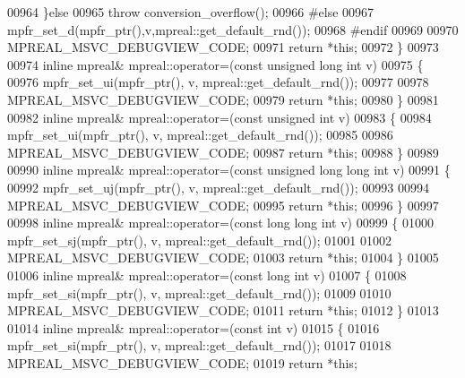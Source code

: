 \begin{DoxyCode}
00964   \}\textcolor{keywordflow}{else}
00965     \textcolor{keywordflow}{throw} conversion\_overflow();
00966 \textcolor{preprocessor}{#else}
00967   mpfr\_set\_d(mpfr\_ptr(),v,mpreal::get\_default\_rnd());
00968 \textcolor{preprocessor}{#endif}
00969 
00970   MPREAL\_MSVC\_DEBUGVIEW\_CODE;
00971     \textcolor{keywordflow}{return} *\textcolor{keyword}{this};
00972 \}
00973 
00974 \textcolor{keyword}{inline} mpreal& mpreal::operator=(\textcolor{keyword}{const} \textcolor{keywordtype}{unsigned} \textcolor{keywordtype}{long} \textcolor{keywordtype}{int} v)
00975 \{
00976     mpfr\_set\_ui(mpfr\_ptr(), v, mpreal::get\_default\_rnd());
00977 
00978     MPREAL\_MSVC\_DEBUGVIEW\_CODE;
00979     \textcolor{keywordflow}{return} *\textcolor{keyword}{this};
00980 \}
00981 
00982 \textcolor{keyword}{inline} mpreal& mpreal::operator=(\textcolor{keyword}{const} \textcolor{keywordtype}{unsigned} \textcolor{keywordtype}{int} v)
00983 \{
00984     mpfr\_set\_ui(mpfr\_ptr(), v, mpreal::get\_default\_rnd());
00985 
00986     MPREAL\_MSVC\_DEBUGVIEW\_CODE;
00987     \textcolor{keywordflow}{return} *\textcolor{keyword}{this};
00988 \}
00989 
00990 \textcolor{keyword}{inline} mpreal& mpreal::operator=(\textcolor{keyword}{const} \textcolor{keywordtype}{unsigned} \textcolor{keywordtype}{long} \textcolor{keywordtype}{long} \textcolor{keywordtype}{int} v)
00991 \{
00992     mpfr\_set\_uj(mpfr\_ptr(), v, mpreal::get\_default\_rnd());
00993 
00994     MPREAL\_MSVC\_DEBUGVIEW\_CODE;
00995     \textcolor{keywordflow}{return} *\textcolor{keyword}{this};
00996 \}
00997 
00998 \textcolor{keyword}{inline} mpreal& mpreal::operator=(\textcolor{keyword}{const} \textcolor{keywordtype}{long} \textcolor{keywordtype}{long} \textcolor{keywordtype}{int} v)
00999 \{
01000     mpfr\_set\_sj(mpfr\_ptr(), v, mpreal::get\_default\_rnd());
01001 
01002     MPREAL\_MSVC\_DEBUGVIEW\_CODE;
01003     \textcolor{keywordflow}{return} *\textcolor{keyword}{this};
01004 \}
01005 
01006 \textcolor{keyword}{inline} mpreal& mpreal::operator=(\textcolor{keyword}{const} \textcolor{keywordtype}{long} \textcolor{keywordtype}{int} v)
01007 \{
01008     mpfr\_set\_si(mpfr\_ptr(), v, mpreal::get\_default\_rnd());
01009 
01010     MPREAL\_MSVC\_DEBUGVIEW\_CODE;
01011     \textcolor{keywordflow}{return} *\textcolor{keyword}{this};
01012 \}
01013 
01014 \textcolor{keyword}{inline} mpreal& mpreal::operator=(\textcolor{keyword}{const} \textcolor{keywordtype}{int} v)
01015 \{
01016     mpfr\_set\_si(mpfr\_ptr(), v, mpreal::get\_default\_rnd());
01017 
01018     MPREAL\_MSVC\_DEBUGVIEW\_CODE;
01019     \textcolor{keywordflow}{return} *\textcolor{keyword}{this};

\end{DoxyCode}
